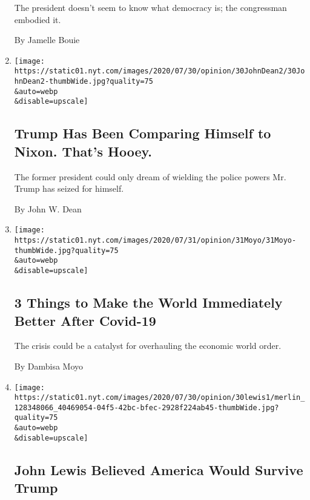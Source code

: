 \begin{enumerate}
  The president doesn't seem to know what democracy is; the congressman
  embodied it.

  By Jamelle Bouie
\item
  \href{/2020/07/31/opinion/trump-nixon-authoritarianism.html}{}

  \texttt{[image: https://static01.nyt.com/images/2020/07/30/opinion/30JohnDean2/30JohnDean2-thumbWide.jpg?quality=75\\\&auto=webp\\\&disable=upscale]}

  \hypertarget{trump-has-been-comparing-himself-to-nixon-thats-hooey}{%
  \subsection{Trump Has Been Comparing Himself to Nixon. That's
  Hooey.}\label{trump-has-been-comparing-himself-to-nixon-thats-hooey}}

  The former president could only dream of wielding the police powers
  Mr. Trump has seized for himself.

  By John W. Dean
\item
  \href{/2020/07/31/opinion/coronavirus-economy.html}{}

  \texttt{[image: https://static01.nyt.com/images/2020/07/31/opinion/31Moyo/31Moyo-thumbWide.jpg?quality=75\\\&auto=webp\\\&disable=upscale]}

  \hypertarget{3-things-to-make-the-world-immediately-better-after-covid-19}{%
  \subsection{3 Things to Make the World Immediately Better After
  Covid-19}\label{3-things-to-make-the-world-immediately-better-after-covid-19}}

  The crisis could be a catalyst for overhauling the economic world
  order.

  By Dambisa Moyo
\item
  \href{/2020/07/30/opinion/john-lewis-legacy.html}{}

  \texttt{[image: https://static01.nyt.com/images/2020/07/30/opinion/30lewis1/merlin\_128348066\_40469054-04f5-42bc-bfec-2928f224ab45-thumbWide.jpg?quality=75\\\&auto=webp\\\&disable=upscale]}

  \hypertarget{john-lewis-believed-america-would-survive-trump}{%
  \subsection{John Lewis Believed America Would Survive
  Trump}\label{john-lewis-believed-america-would-survive-trump}}


\end{enumerate}
